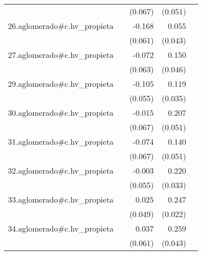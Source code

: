 {\begin{longtable}{l*{4}{D{.}{.}{-1}}}
            &                     &     (0.067)         &     (0.051)         &                     \\
\addlinespace
26.aglomerado#c.hv\_propieta&                     &      -0.168\sym{**} &       0.055         &                     \\
            &                     &     (0.061)         &     (0.043)         &                     \\
\addlinespace
27.aglomerado#c.hv\_propieta&                     &      -0.072         &       0.150\sym{**} &                     \\
            &                     &     (0.063)         &     (0.046)         &                     \\
\addlinespace
29.aglomerado#c.hv\_propieta&                     &      -0.105         &       0.119\sym{***}&                     \\
            &                     &     (0.055)         &     (0.035)         &                     \\
\addlinespace
30.aglomerado#c.hv\_propieta&                     &      -0.015         &       0.207\sym{***}&                     \\
            &                     &     (0.067)         &     (0.051)         &                     \\
\addlinespace
31.aglomerado#c.hv\_propieta&                     &      -0.074         &       0.140\sym{**} &                     \\
            &                     &     (0.067)         &     (0.051)         &                     \\
\addlinespace
32.aglomerado#c.hv\_propieta&                     &      -0.003         &       0.220\sym{***}&                     \\
            &                     &     (0.055)         &     (0.033)         &                     \\
\addlinespace
33.aglomerado#c.hv\_propieta&                     &       0.025         &       0.247\sym{***}&                     \\
            &                     &     (0.049)         &     (0.022)         &                     \\
\addlinespace
34.aglomerado#c.hv\_propieta&                     &       0.037         &       0.259\sym{***}&                     \\
            &                     &     (0.061)         &     (0.043)         &                     \\

\end{longtable}}
